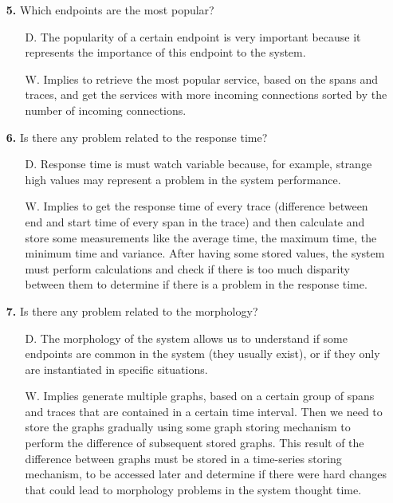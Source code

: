 \begin{itemize}
    \item[\textbf{5.}] Which endpoints are the most popular?
    \begin{itemize}
        \item[D.] The popularity of a certain endpoint is very important because it represents the importance of this endpoint to the system.
        \item[W.] Implies to retrieve the most popular service, based on the spans and traces, and get the services with more incoming connections sorted by the number of incoming connections.
    \end{itemize}

    \item[\textbf{6.}] Is there any problem related to the response time?
    \begin{itemize}
        \item[D.] Response time is must watch variable because, for example, strange high values may represent a problem in the system performance.
        \item[W.] Implies to get the response time of every trace (difference between end and start time of every span in the trace) and then calculate and store some measurements like the average time, the maximum time, the minimum time and variance. After having some stored values, the system must perform calculations and check if there is too much disparity between them to determine if there is a problem in the response time.
    \end{itemize}

    \item[\textbf{7.}] Is there any problem related to the morphology?
    \begin{itemize}
        \item[D.] The morphology of the system allows us to understand if some endpoints are common in the system (they usually exist), or if they only are instantiated in specific situations.
        \item[W.] Implies generate multiple graphs, based on a certain group of spans and traces that are contained in a certain time interval. Then we need to store the graphs gradually using some graph storing mechanism to perform the difference of subsequent stored graphs. This result of the difference between graphs must be stored in a time-series storing mechanism, to be accessed later and determine if there were hard changes that could lead to morphology problems in the system thought time.
    \end{itemize}
    

\end{itemize}
